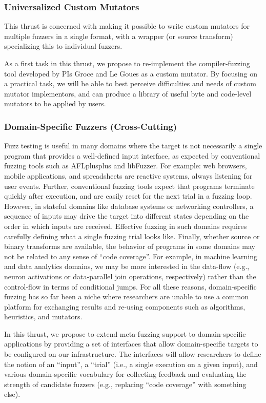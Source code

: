 \subsubsection{Universalized Custom Mutators}

This thrust is concerned with making it possible to write custom mutators for 
multiple fuzzers in a single format, with a wrapper (or source transform) 
specializing this to individual fuzzers.

As a first task in this thrust, we propose to re-implement the compiler-fuzzing 
tool developed by PIs Groce and Le Goues as a custom mutator.  By focusing on a 
practical task, we will be able to best perceive difficulties and needs of 
custom mutator implementors, and can produce a library of useful byte and 
code-level mutators to be applied by users.

\subsubsection{Domain-Specific Fuzzers (Cross-Cutting)}

Fuzz testing is useful in many domains where the target is not necessarily a single program that
provides a well-defined input interface, as expected by conventional fuzzing tools such as
AFLplusplus and libFuzzer. For example: web browsers, mobile applications, and spreadsheets 
are reactive systems, always listening for user events. Further, conventional fuzzing tools 
expect that programs terminate quickly after execution, and are easily reset 
for the next trial in a fuzzing loop. However, in stateful domains like database systems 
or networking controllers, a sequence of inputs may drive the target into different states
depending on the order in which inputs are received. Effective fuzzing in such domains requires
carefully defining what a single fuzzing trial looks like. Finally, whether source or binary 
transforms are available, the behavior of programs in some domains may not be related to
any sense of ``code coverage''. For example, in machine learning and data analytics domains,
we may be more interested in the data-flow (e.g., neuron activations or 
data-parallel join operations, respectively) rather than the control-flow in terms of 
conditional jumps. For all these reasons, domain-specific fuzzing has so far been a niche where
researchers are unable to use a common platform for exchanging results and re-using components
such as algorithms, heuristics, and mutators.

In this thrust, we propose to extend meta-fuzzing support to domain-specific applications by
providing a set of interfaces that allow domain-specific targets to be configured on our
infrastructure. The interfaces will allow researchers to define the notion of an ``input'',
a ``trial'' (i.e., a single execution on a given input), and various domain-specific vocabulary
for collecting feedback and evaluating the strength of candidate fuzzers (e.g., replacing ``code
coverage'' with something else). 

